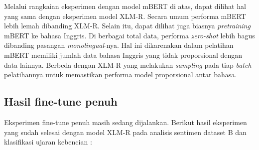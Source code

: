         Melalui rangkaian eksperimen dengan model mBERT di atas, dapat dilihat hal yang sama dengan eksperimen model XLM-R. Secara umum performa mBERT lebih lemah dibanding XLM-R. Selain itu, dapat dilihat juga biasnya \textit{pretraining} mBERT ke bahasa Inggris. Di berbagai total data, performa \textit{zero-shot} lebih bagus dibanding pasangan \textit{monolingual}-nya. Hal ini dikarenakan dalam pelatihan mBERT memiliki jumlah data bahasa Inggris yang tidak proporsional dengan data lainnya. Berbeda dengan XLM-R yang melakukan \textit{sampling} pada tiap \textit{batch} pelatihannya untuk memastikan performa model proporsional antar bahasa.
            

    \subsection{Hasil fine-tune penuh}
        Eksperimen fine-tune penuh masih sedang dijalankan. Berikut hasil eksperimen yang sudah selesai dengan model XLM-R pada analisis sentimen dataset B dan klasifikasi ujaran kebencian :

